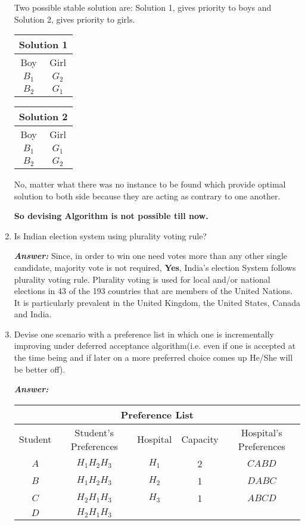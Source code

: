 \documentclass[15pt]{article}
\begin{document}
\begin{enumerate}
Two possible stable solution are:
Solution 1, gives priority to boys and Solution 2, gives priority to girls.

\begin{center}
\begin{tabular}{ |c|c| } 
 \hline
 \multicolumn{2}{|c|}{Solution 1} \\ 
 \hline
 Boy & Girl  \\ [0.5ex] 
 \hline
 $B_1$ & $G_2$ \\ 
 \hline
 $B_2$ & $G_1$ \\ [1ex] 
 \hline
\end{tabular}
\begin{tabular}{ |c|c| } 
 \hline
 \multicolumn{2}{|c|}{Solution 2} \\ 
 \hline
 Boy & Girl  \\ [0.5ex] 
 \hline
 $B_1$ & $G_1$ \\ 
 \hline
 $B_2$ & $G_2$\\ [1ex] 
 \hline
\end{tabular}
\end{center}

No, matter what there was no instance to be found which provide optimal solution to both side because they are acting as contrary to one another.

\textbf{So devising Algorithm is not possible till now.}

\item 
Is Indian election system using plurality voting rule?

\textbf{\emph{Answer: }} Since, in order to win one need votes more than any other single candidate, majority vote is not required, \textbf{Yes}, India’s election System follows plurality voting rule. Plurality voting is used for local and/or national elections in 43 of the 193 countries that are members of the United Nations. It is particularly prevalent in the United Kingdom, the United States, Canada and India. 

\item 
Devise one scenario with a preference list in which one is incrementally improving under deferred acceptance algorithm(i.e. even if one is accepted at the time being and if later on a more preferred choice comes up He/She will be better off).

\textbf{\emph{Answer: }}

\begin{center}
\begin{tabular}{ |c|c|c|c|c| } 
 \hline
 \multicolumn{5}{|c|}{Preference List} \\ 
 \hline
 Student & Student's Preferences & Hospital & Capacity & Hospital's Preferences  \\ [0.5ex] 
 \hline
 $A$ & $H_1 H_2 H_3$ & $H_1$ & 2 & $C A B D$ \\ 
 \hline
 $B$ & $H_1 H_2 H_3$ & $H_2$ & 1 & $D A B C$ \\ 
 \hline
 $C$ & $H_2 H_1 H_3$ & $H_3$ & 1 & $A B C D$ \\ 
 \hline
 $D$ & $H_2 H_1 H_3$ &  & & \\ [1ex] 
 \hline
\end{tabular}
\end{center}


\end{enumerate}
\end{document}
